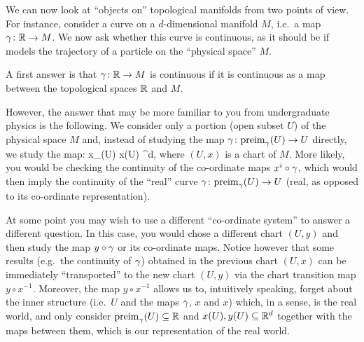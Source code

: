 We can now look at ``objects on'' topological manifolds from two points of view. For instance, consider a curve on a $d$-dimensional manifold $M$, i.e.\ a map $\gamma\colon \mathbb{R}\to M$. We now ask whether this curve is continuous, as it should be if models the trajectory of a particle on the ``physical space'' $M$.

A first answer is that $\gamma\colon \mathbb{R} \to M$ is continuous if it is continuous as a map between the topological spaces $\mathbb{R}$ and $M$.

However, the answer that may be more familiar to you from undergraduate physics is the following. We consider only a portion (open subset $U$) of the physical space $M$ and, instead of studying the map $\gamma\colon\mathrm{preim}_\gamma(U)\to U$ directly, we study the map:
\bse
x\circ \g\cl {}_\g(U) \to x(U) \se \R^d,
\ese
where $(U,x)$ is a chart of $M$. More likely, you would be checking the continuity of the co-ordinate maps $x^i\circ \gamma$, which would then imply the continuity of the ``real'' curve $\gamma\colon\mathrm{preim}_\gamma(U)\to U$ (real, as opposed to its co-ordinate representation).
\bse
{}
\ese
At some point you may wish to use a different ``co-ordinate system'' to answer a different question. In this case, you would chose a different chart $(U,y)$ and then study the map $y\circ \gamma$ or its co-ordinate maps. Notice however that some results (e.g.\ the continuity of $\gamma$) obtained in the previous chart $(U,x)$ can be immediately ``transported'' to the new chart $(U,y)$ via the chart transition map $y\circ x^{-1}$. Moreover, the map $y\circ x^{-1}$ allows us to, intuitively speaking, forget about the inner structure (i.e.\ $U$ and the maps $\gamma$, $x$ and $x$) which, in a sense, is the real world, and only consider $\mathrm{preim}_\gamma(U)\subseteq \mathbb{R}$ and $x(U),y(U)\subseteq\mathbb{R}^d$ together with the maps between them, which is our representation of the real world.














